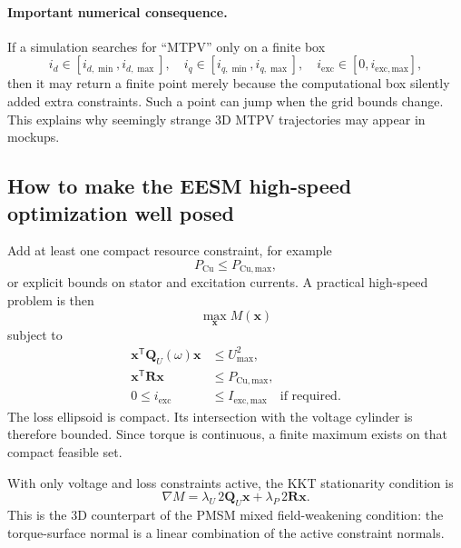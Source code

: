 \documentclass[11pt,a4paper]{article}
\newcommand{\ie}{i_{\mathrm{exc}}}
\newcommand{\Umax}{U_{\max}}
\newcommand{\Pmax}{P_{\mathrm{Cu,max}}}
\newcommand{\T}{\mathsf{T}}
\newcommand{\vct}[1]{\bm{#1}}
\newcommand{\mat}[1]{\bm{#1}}
\begin{document}
\paragraph{Important numerical consequence.}
If a simulation searches for ``MTPV'' only on a finite box
\begin{equation}
  i_d\in[i_{d,\min},i_{d,\max}],\quad
  i_q\in[i_{q,\min},i_{q,\max}],\quad
  i_{\mathrm{exc}}\in[0,i_{\mathrm{exc,max}}],
\end{equation}
then it may return a finite point merely because the computational box silently added extra constraints. Such a point can jump when the grid bounds change. This explains why seemingly strange 3D MTPV trajectories may appear in mockups.

\subsection{How to make the EESM high-speed optimization well posed}

Add at least one compact resource constraint, for example
\begin{equation}
  P_{\mathrm{Cu}}\le\Pmax,
  \label{eq:loss-bound}
\end{equation}
or explicit bounds on stator and excitation currents. A practical high-speed problem is then
\begin{equation}
  \boxed{
  \max_{\vct x}M(\vct x)
  }
\end{equation}
subject to
\begin{align}
  \vct x^\T\mat Q_U(\omega)\vct x&\le\Umax^2,\\
  \vct x^\T\mat R\vct x&\le\Pmax,\\
  0\le\ie&\le I_{\mathrm{exc,max}}
  \quad\text{if required.}
  \label{eq:eesm-practical-opt}
\end{align}
The loss ellipsoid is compact. Its intersection with the voltage cylinder is therefore bounded. Since torque is continuous, a finite maximum exists on that compact feasible set.

With only voltage and loss constraints active, the KKT stationarity condition is
\begin{equation}
  \boxed{
  \nabla M
  =\lambda_U\,2\mat Q_U\vct x
  +\lambda_P\,2\mat R\vct x.
  }
  \label{eq:eesm-kkt}
\end{equation}
This is the 3D counterpart of the PMSM mixed field-weakening condition: the torque-surface normal is a linear combination of the active constraint normals.
\end{document}
